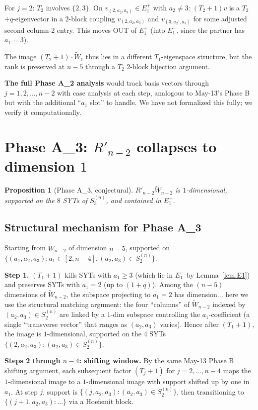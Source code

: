 \documentclass[11pt]{article}
\newtheorem{proposition}[theorem]{Proposition}
\theoremstyle{definition}
\begin{document}
For $j=2$: $T_2$ involves $\{2,3\}$.  On $v_{(2,a_2,a_3)}\in
E_1^+$ with $a_2\ne 3$: $(T_2{+}1)v$ is a $T_2$ $+q$-eigenvector
in a $2$-block coupling $v_{(2,a_2,a_3)}$ and $v_{(3,a_2',a_3)}$
for some adjusted second column-$2$ entry.  This moves OUT of
$E_1^+$ (into $E_1^-$, since the partner has $a_1=3$).

The image $(T_2{+}1)\cdot\widetilde{W}_1$ thus lies in a different
$T_1$-eigenspace structure, but the rank is preserved at $n-5$
through a $T_2$ $2$-block bijection argument.

\textbf{The full Phase A_2 analysis} would track basis vectors
through $j=1,2,\ldots,n-2$ with case analysis at each step,
analogous to May-13's Phase B but with the additional ``$a_1$
slot'' to handle.  We have not formalized this fully; we
verify it computationally.

\section{Phase A_3: $R'_{n-2}$ collapses to dimension $1$}\label{sec:phaseA3}

\begin{proposition}[Phase A_3, conjectural]\label{prop:phaseA3}
$R'_{n-2}\widetilde{W}_{n-2}$ is $1$-dimensional, supported on the
$8$ SYTs of $S_3^{(n)}$, and contained in $E_1^-$.
\end{proposition}

\subsection{Structural mechanism for Phase A_3}

Starting from $\widetilde{W}_{n-2}$ of dimension $n-5$, supported
on $\{(a_1,a_2,a_3):a_1\in[2,n-4],(a_2,a_3)\in S_2^{(n)}\}$.

\textbf{Step 1.}  $(T_1{+}1)$ kills SYTs with $a_1\ge 3$
(which lie in $E_1^-$ by Lemma~\ref{lem:E1}) and preserves SYTs
with $a_1=2$ (up to $(1{+}q)$).  Among the $(n-5)$ dimensions of
$\widetilde{W}_{n-2}$, the subspace projecting to $a_1=2$ has
dimension... here we use the structural matching argument:
the four ``columns'' of $\widetilde{W}_{n-2}$ indexed by
$(a_2,a_3)\in S_2^{(n)}$ are linked by a $1$-dim subspace
controlling the $a_1$-coefficient (a single ``transverse vector''
that ranges as $(a_2,a_3)$ varies).  Hence after $(T_1{+}1)$, the
image is $1$-dimensional, supported on the $4$ SYTs
$\{(2,a_2,a_3):(a_2,a_3)\in S_2^{(n)}\}$.

\textbf{Steps 2 through $n-4$: shifting window.}  By the same
May-13 Phase B shifting argument, each subsequent factor
$(T_j{+}1)$ for $j=2,\ldots,n-4$ maps the $1$-dimensional image
to a $1$-dimensional image with support shifted up by one in
$a_1$.  At step $j$, support is
$\{(j,a_2,a_3):(a_2,a_3)\in S_2^{(n)}\}$, then transitioning to
$\{(j+1,a_2,a_3):\ldots\}$ via a Hoefsmit block.
\end{document}

